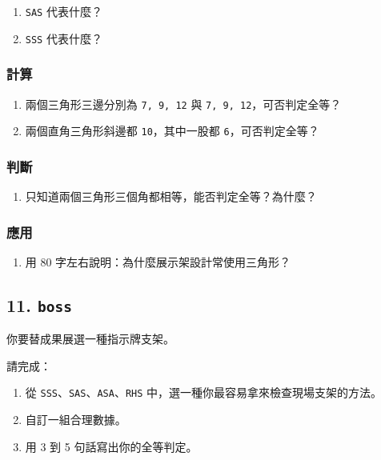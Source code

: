 \documentclass[
  chinese,
  12pt,
  a4paper,
  oneside]{article}
\providecommand{\tightlist}{%
  \setlength{\itemsep}{0pt}\setlength{\parskip}{0pt}}
\begin{document}
\begin{enumerate}
\def\labelenumi{\arabic{enumi}.}
\tightlist
\item
  \texttt{SAS} 代表什麼？
\item
  \texttt{SSS} 代表什麼？
\end{enumerate}

\subsubsection{計算}\label{ux8a08ux7b97-3}

\begin{enumerate}
\def\labelenumi{\arabic{enumi}.}
\setcounter{enumi}{2}
\tightlist
\item
  兩個三角形三邊分別為 \texttt{7,\ 9,\ 12} 與
  \texttt{7,\ 9,\ 12}，可否判定全等？
\item
  兩個直角三角形斜邊都 \texttt{10}，其中一股都
  \texttt{6}，可否判定全等？
\end{enumerate}

\subsubsection{判斷}\label{ux5224ux65b7-5}

\begin{enumerate}
\def\labelenumi{\arabic{enumi}.}
\setcounter{enumi}{4}
\tightlist
\item
  只知道兩個三角形三個角都相等，能否判定全等？為什麼？
\end{enumerate}

\subsubsection{應用}\label{ux61c9ux7528-3}

\begin{enumerate}
\def\labelenumi{\arabic{enumi}.}
\setcounter{enumi}{5}
\tightlist
\item
  用 80 字左右說明：為什麼展示架設計常使用三角形？
\end{enumerate}

\subsection{\texorpdfstring{11. \texttt{boss}}{11. boss}}\label{boss-3}

你要替成果展選一種指示牌支架。

請完成：

\begin{enumerate}
\def\labelenumi{\arabic{enumi}.}
\tightlist
\item
  從 \texttt{SSS}、\texttt{SAS}、\texttt{ASA}、\texttt{RHS}
  中，選一種你最容易拿來檢查現場支架的方法。
\item
  自訂一組合理數據。
\item
  用 3 到 5 句話寫出你的全等判定。
\end{enumerate}
\end{document}

